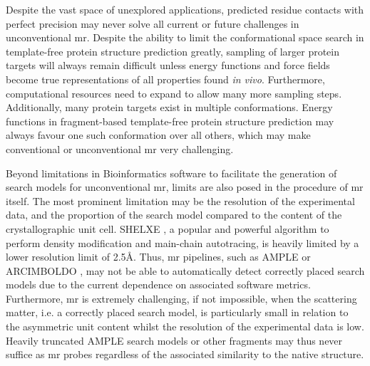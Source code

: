 Despite the vast space of unexplored applications, predicted residue contacts with perfect precision may never solve all current or future challenges in unconventional \gls{mr}. Despite the ability to limit the conformational space search in template-free protein structure prediction greatly, sampling of larger protein targets will always remain difficult unless energy functions and force fields become true representations of all properties found \textit{in vivo}. Furthermore, computational resources need to expand to allow many more sampling steps. Additionally, many protein targets exist in multiple conformations. Energy functions in fragment-based template-free protein structure prediction may always favour one such conformation over all others, which may make conventional or unconventional \gls{mr} very challenging. 

Beyond limitations in Bioinformatics software to facilitate the generation of search models for unconventional \gls{mr}, limits are also posed in the procedure of \gls{mr} itself. The most prominent limitation may be the resolution of the experimental data, and the proportion of the search model compared to the content of the crystallographic unit cell. SHELXE \cite{Thorn2013-le}, a popular and powerful algorithm to perform density modification and main-chain autotracing, is heavily limited by a lower resolution limit of 2.5\AA. Thus, \gls{mr} pipelines, such as AMPLE \cite{Bibby2012-lm} or ARCIMBOLDO \cite{Sammito2015-dv}, may not be able to automatically detect correctly placed search models due to the current dependence on associated software metrics. Furthermore, \gls{mr} is extremely challenging, if not impossible, when the scattering matter, i.e. a correctly placed search model, is particularly small in relation to the asymmetric unit content whilst the resolution of the experimental data is low. Heavily truncated AMPLE search models or other fragments may thus never suffice as \gls{mr} probes regardless of the associated similarity to the native structure.

